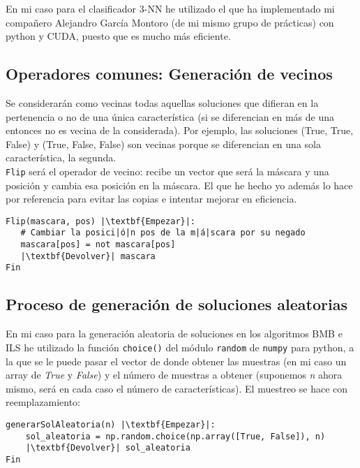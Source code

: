 \documentclass[12pt]{article}
\begin{document}
En mi caso para el clasificador 3-NN he utilizado el que ha implementado mi compañero Alejandro García Montoro (de mi mismo grupo de prácticas) con python y CUDA, puesto que es mucho más eficiente.

\subsection{Operadores comunes: Generación de vecinos}
Se considerarán como vecinas todas aquellas soluciones que difieran en la pertenencia o no de una única característica (si se diferencian en más de una entonces no es vecina de la considerada). Por ejemplo, las soluciones (True, True, False) y (True, False, False) son vecinas porque se diferencian en una sola característica, la segunda.\\
\texttt{Flip} será el operador de vecino: recibe un vector que será la máscara y una posición y cambia esa posición en la máscara. El que he hecho yo además lo hace por referencia para evitar las copias e intentar mejorar en eficiencia.\\

\begin{lstlisting}
Flip(mascara, pos) |\textbf{Empezar}|:
   # Cambiar la posici|ó|n pos de la m|á|scara por su negado 
   mascara[pos] = not mascara[pos]
   |\textbf{Devolver}| mascara
Fin
\end{lstlisting}

\subsection{Proceso de generación de soluciones aleatorias}
En mi caso para la generación aleatoria de soluciones en los algoritmos BMB e ILS he utilizado la función \texttt{choice()} del módulo \texttt{random} de \texttt{numpy} para python, a la que se le puede pasar el vector de donde obtener las muestras (en mi caso un array de \textit{True} y \textit{False}) y el número de muestras a obtener (suponemos \textit{n} ahora mismo, será en cada caso el número de características). El muestreo se hace con reemplazamiento:
\begin{lstlisting}
generarSolAleatoria(n) |\textbf{Empezar}|:
	sol_aleatoria = np.random.choice(np.array([True, False]), n)
	|\textbf{Devolver}| sol_aleatoria
Fin
\end{lstlisting}
\end{document}
